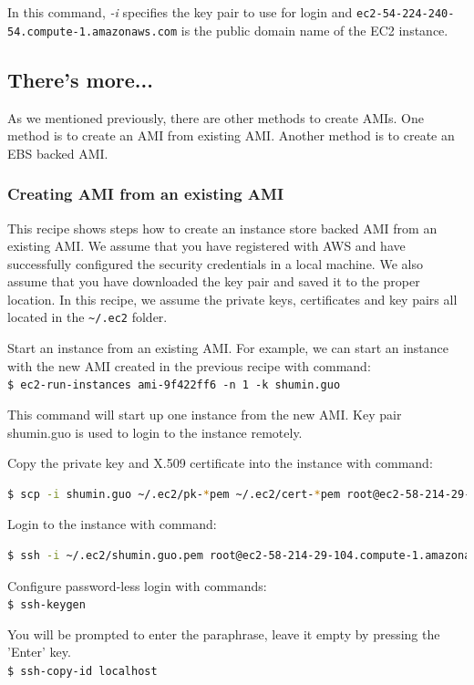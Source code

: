 In this command, \emph{-i} specifies the key pair to use for login and \verb|ec2-54-224-240-54.compute-1.amazonaws.com| is the public domain name of the EC2 instance.

\subsection*{There's more...}
As we mentioned previously, there are other methods to create AMIs. One method is to create an AMI from existing AMI. Another method is to create an EBS backed AMI.

\subsubsection*{Creating AMI from an existing AMI}
This recipe shows steps how to create an instance store backed AMI from an existing AMI. We assume that you have registered with AWS and have successfully configured the security credentials in a local machine. We also assume that you have downloaded the key pair and saved it to the proper location. In this recipe, we assume the private keys, certificates and key pairs all located in the \verb|~/.ec2| folder.

Start an instance from an existing AMI. For example, we can start an instance with the new AMI created in the previous recipe with command: \\
\verb|$ ec2-run-instances ami-9f422ff6 -n 1 -k shumin.guo|

This command will start up one instance from the new AMI. Key pair shumin.guo is used to login to the instance remotely.


Copy the private key and X.509 certificate into the instance with command:
\lstset{style=bashstyle}
\begin{lstlisting}[language=bash]
$ scp -i shumin.guo ~/.ec2/pk-*pem ~/.ec2/cert-*pem root@ec2-58-214-29-104.compute-1.amazonaws.com:~/.ec2/
\end{lstlisting}

Login to the instance with command:
\lstset{style=bashstyle}
\begin{lstlisting}[language=bash]
$ ssh -i ~/.ec2/shumin.guo.pem root@ec2-58-214-29-104.compute-1.amazonaws.com
\end{lstlisting}

Configure password-less login with commands: \\
\verb|$ ssh-keygen|

You will be prompted to enter the paraphrase, leave it empty by pressing the 'Enter' key. \\
\verb|$ ssh-copy-id localhost|

